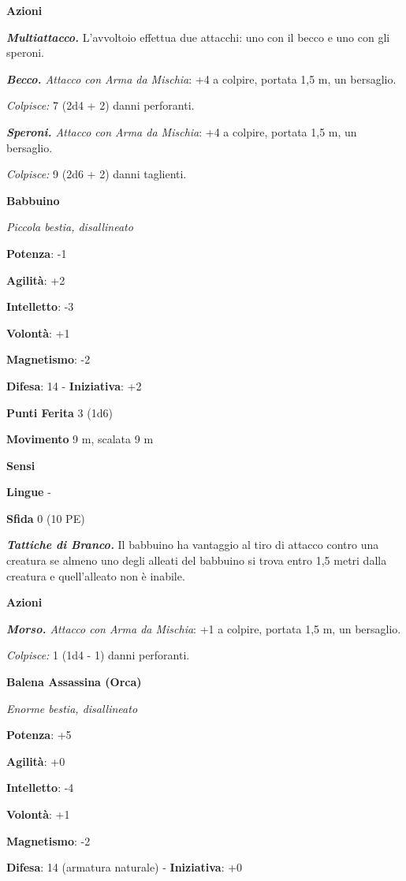 \begin{multicols}{2}
\textbf{Azioni}

\emph{\textbf{Multiattacco.}} L'avvoltoio effettua due attacchi: uno con
il becco e uno con gli speroni.

\emph{\textbf{Becco.} Attacco con Arma da Mischia}: +4 a colpire,
portata 1,5 m, un bersaglio.

\emph{Colpisce:} 7 (2d4 + 2) danni perforanti.

\emph{\textbf{Speroni.} Attacco con Arma da Mischia}: +4 a colpire,
portata 1,5 m, un bersaglio.

\emph{Colpisce:} 9 (2d6 + 2) danni taglienti.

\textbf{Babbuino}

\emph{Piccola bestia, disallineato}

\textbf{Potenza}: -1

\textbf{Agilità}: +2

\textbf{Intelletto}: -3

\textbf{Volontà}: +1

\textbf{Magnetismo}: -2

\textbf{Difesa}: 14 - \textbf{Iniziativa}: +2

\textbf{Punti Ferita} 3 (1d6)

\textbf{Movimento} 9 m, scalata 9 m

\textbf{Sensi} 

\textbf{Lingue} -

\textbf{Sfida} 0 (10 PE)

\emph{\textbf{Tattiche di Branco.}} Il babbuino ha vantaggio al tiro di
attacco contro una creatura se almeno uno degli alleati del babbuino si
trova entro 1,5 metri dalla creatura e quell'alleato non è inabile.

\textbf{Azioni}

\emph{\textbf{Morso.} Attacco con Arma da Mischia}: +1 a colpire,
portata 1,5 m, un bersaglio.

\emph{Colpisce:} 1 (1d4 - 1) danni perforanti.



\textbf{Balena Assassina (Orca)}

\emph{Enorme bestia, disallineato}

\textbf{Potenza}: +5

\textbf{Agilità}: +0

\textbf{Intelletto}: -4

\textbf{Volontà}: +1

\textbf{Magnetismo}: -2

\textbf{Difesa}: 14 (armatura naturale) - \textbf{Iniziativa}: +0


\end{multicols}

